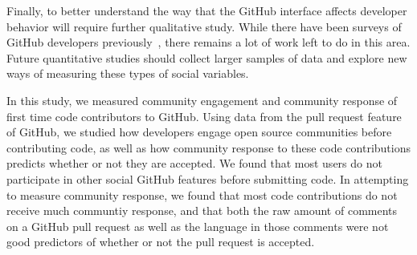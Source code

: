 \documentclass{iitthesis}
\begin{document}
Finally, to better understand the way that the GitHub interface affects
developer behavior will require further qualitative study. While there have been
surveys of GitHub developers previously~\cite{mcdonald_performance_2013}, there
remains a lot of work left to do in this area. Future quantitative studies
should collect larger samples of data and explore new ways of measuring these
types of social variables.


In this study, we measured community engagement and community response of first
time code contributors to GitHub. Using data from the pull request feature of
GitHub, we studied how developers engage open source communities before
contributing code, as well as how community response to these code contributions
predicts whether or not they are accepted. We found that most users do not
participate in other social GitHub features before submitting code.  In
attempting to measure community response, we found that most code contributions
do not receive much communtiy response, and that both the raw amount of comments
on a GitHub pull request as well as the language in those comments were not good
predictors of whether or not the pull request is accepted.


\clearpage


%
%

\appendix

%
%




\end{document}
